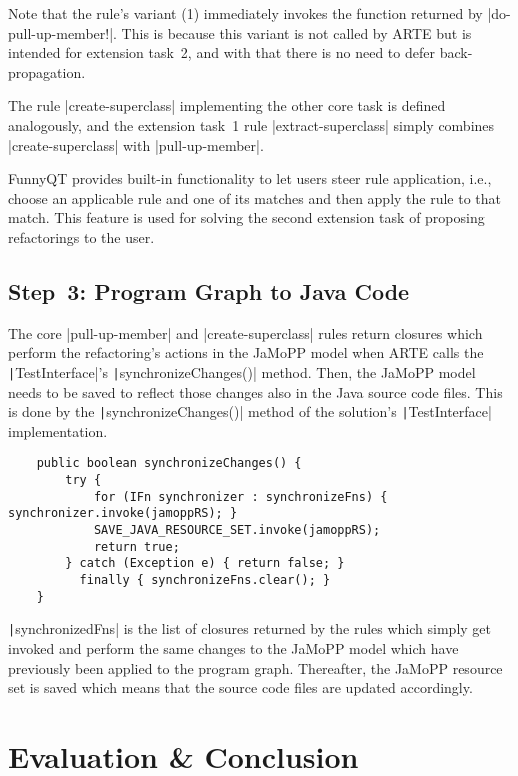 \documentclass[submission]{eptcs}
\newcommand{\code}{\clojureinline}
\begin{document}
Note that the rule's variant (1) immediately invokes the function returned by
\code|do-pull-up-member!|.  This is because this variant is not called by ARTE
but is intended for extension task~2, and with that there is no need to defer
back-propagation.

The rule \code|create-superclass| implementing the other core task is defined
analogously, and the extension task~1 rule \code|extract-superclass| simply
combines \code|create-superclass| with \code|pull-up-member|.

FunnyQT provides built-in functionality to let users steer rule application,
i.e., choose an applicable rule and one of its matches and then apply the rule
to that match.  This feature is used for solving the second extension task of
proposing refactorings to the user.


\subsection{Step~3: Program Graph to Java Code}
\label{sec:step-3:pg-to-java}

The core \code|pull-up-member| and \code|create-superclass| rules return
closures which perform the refactoring's actions in the JaMoPP model when ARTE
calls the \texttt|TestInterface|'s
\texttt|synchronizeChanges()| method.  Then, the JaMoPP model needs
to be saved to reflect those changes also in the Java source code files.  This
is done by the \texttt|synchronizeChanges()| method of the solution's
\texttt|TestInterface| implementation.

\begin{verbatim}
    public boolean synchronizeChanges() {
        try {
            for (IFn synchronizer : synchronizeFns) { synchronizer.invoke(jamoppRS); }
            SAVE_JAVA_RESOURCE_SET.invoke(jamoppRS);
            return true;
        } catch (Exception e) { return false; }
          finally { synchronizeFns.clear(); }
    }
\end{verbatim}

\texttt|synchronizedFns| is the list of closures returned by the
rules which simply get invoked and perform the same changes to the JaMoPP model
which have previously been applied to the program graph.  Thereafter, the
JaMoPP resource set is saved which means that the source code files are updated
accordingly.


\section{Evaluation \& Conclusion}
\label{sec:evaluation}
\end{document}
